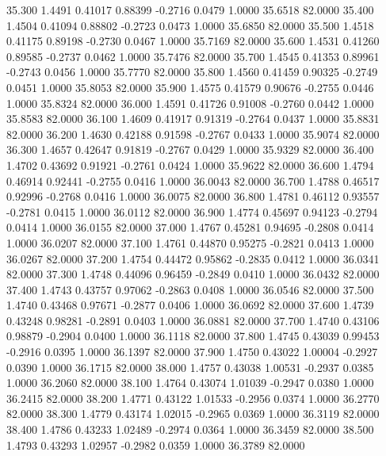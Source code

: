   35.300   1.4491   0.41017   0.88399  -0.2716   0.0479   1.0000  35.6518  82.0000
  35.400   1.4504   0.41094   0.88802  -0.2723   0.0473   1.0000  35.6850  82.0000
  35.500   1.4518   0.41175   0.89198  -0.2730   0.0467   1.0000  35.7169  82.0000
  35.600   1.4531   0.41260   0.89585  -0.2737   0.0462   1.0000  35.7476  82.0000
  35.700   1.4545   0.41353   0.89961  -0.2743   0.0456   1.0000  35.7770  82.0000
  35.800   1.4560   0.41459   0.90325  -0.2749   0.0451   1.0000  35.8053  82.0000
  35.900   1.4575   0.41579   0.90676  -0.2755   0.0446   1.0000  35.8324  82.0000
  36.000   1.4591   0.41726   0.91008  -0.2760   0.0442   1.0000  35.8583  82.0000
  36.100   1.4609   0.41917   0.91319  -0.2764   0.0437   1.0000  35.8831  82.0000
  36.200   1.4630   0.42188   0.91598  -0.2767   0.0433   1.0000  35.9074  82.0000
  36.300   1.4657   0.42647   0.91819  -0.2767   0.0429   1.0000  35.9329  82.0000
  36.400   1.4702   0.43692   0.91921  -0.2761   0.0424   1.0000  35.9622  82.0000
  36.600   1.4794   0.46914   0.92441  -0.2755   0.0416   1.0000  36.0043  82.0000
  36.700   1.4788   0.46517   0.92996  -0.2768   0.0416   1.0000  36.0075  82.0000
  36.800   1.4781   0.46112   0.93557  -0.2781   0.0415   1.0000  36.0112  82.0000
  36.900   1.4774   0.45697   0.94123  -0.2794   0.0414   1.0000  36.0155  82.0000
  37.000   1.4767   0.45281   0.94695  -0.2808   0.0414   1.0000  36.0207  82.0000
  37.100   1.4761   0.44870   0.95275  -0.2821   0.0413   1.0000  36.0267  82.0000
  37.200   1.4754   0.44472   0.95862  -0.2835   0.0412   1.0000  36.0341  82.0000
  37.300   1.4748   0.44096   0.96459  -0.2849   0.0410   1.0000  36.0432  82.0000
  37.400   1.4743   0.43757   0.97062  -0.2863   0.0408   1.0000  36.0546  82.0000
  37.500   1.4740   0.43468   0.97671  -0.2877   0.0406   1.0000  36.0692  82.0000
  37.600   1.4739   0.43248   0.98281  -0.2891   0.0403   1.0000  36.0881  82.0000
  37.700   1.4740   0.43106   0.98879  -0.2904   0.0400   1.0000  36.1118  82.0000
  37.800   1.4745   0.43039   0.99453  -0.2916   0.0395   1.0000  36.1397  82.0000
  37.900   1.4750   0.43022   1.00004  -0.2927   0.0390   1.0000  36.1715  82.0000
  38.000   1.4757   0.43038   1.00531  -0.2937   0.0385   1.0000  36.2060  82.0000
  38.100   1.4764   0.43074   1.01039  -0.2947   0.0380   1.0000  36.2415  82.0000
  38.200   1.4771   0.43122   1.01533  -0.2956   0.0374   1.0000  36.2770  82.0000
  38.300   1.4779   0.43174   1.02015  -0.2965   0.0369   1.0000  36.3119  82.0000
  38.400   1.4786   0.43233   1.02489  -0.2974   0.0364   1.0000  36.3459  82.0000
  38.500   1.4793   0.43293   1.02957  -0.2982   0.0359   1.0000  36.3789  82.0000
